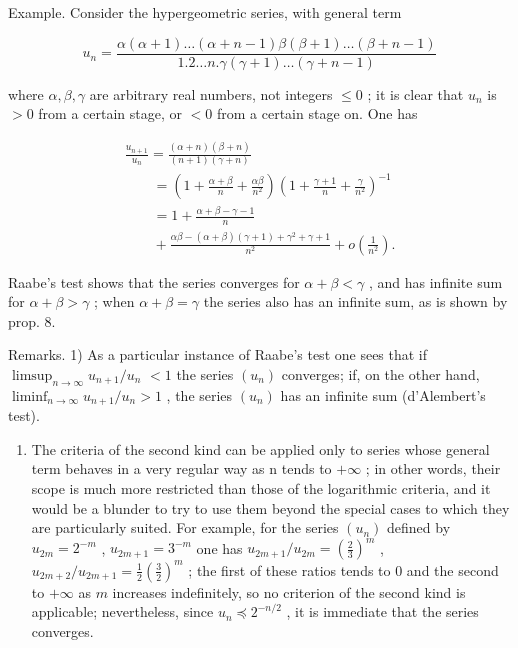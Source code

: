 Example. Consider the hypergeometric series, with general term

\[
u _ {n} = \frac {\alpha (\alpha + 1) \dots (\alpha + n - 1) \beta (\beta + 1) \dots (\beta + n - 1)}{1 . 2 \dots n . \gamma (\gamma + 1) \dots (\gamma + n - 1)}
\]

where \(\alpha, \beta, \gamma\) are arbitrary real numbers, not integers \(\leqslant 0\) ; it is clear that \(u_{n}\) is \(>0\) from a certain stage, or \(< 0\) from a certain stage on. One has

\[
\begin{array}{l} \frac {u _ {n + 1}}{u _ {n}} = \frac {(\alpha + n) (\beta + n)}{(n + 1) (\gamma + n)} \\ \qquad = \left(1 + \frac {\alpha + \beta}{n} + \frac {\alpha \beta}{n ^ {2}}\right) \left(1 + \frac {\gamma + 1}{n} + \frac {\gamma}{n ^ {2}}\right) ^ {- 1} \\ \qquad = 1 + \frac {\alpha + \beta - \gamma - 1}{n} \\ \qquad + \frac {\alpha \beta - (\alpha + \beta) (\gamma + 1) + \gamma^ {2} + \gamma + 1}{n ^ {2}} + o \left(\frac {1}{n ^ {2}}\right). \end{array}
\]

Raabe's test shows that the series converges for \(\alpha +\beta <  \gamma\) , and has infinite sum for \(\alpha +\beta >\gamma\) ; when \(\alpha +\beta = \gamma\) the series also has an infinite sum, as is shown by prop. 8.

Remarks. 1) As a particular instance of Raabe's test one sees that if \(\limsup_{n\to \infty}u_{n + 1} / u_n\) \(< 1\) the series \((u_{n})\) converges; if, on the other hand, \(\liminf_{n\to \infty}u_{n + 1} / u_n > 1\) , the series \((u_{n})\) has an infinite sum (d'Alembert's test).

\begin{enumerate}
\def\labelenumi{\arabic{enumi})}
\setcounter{enumi}{1}
\tightlist
\item
  The criteria of the second kind can be applied only to series whose general term behaves in a very regular way as n tends to \(+\infty\) ; in other words, their scope is much more restricted than those of the logarithmic criteria, and it would be a blunder to try to use them beyond the special cases to which they are particularly suited. For example, for the series \((u_{n})\) defined by \(u_{2m} = 2^{-m}\) , \(u_{2m + 1} = 3^{-m}\) one has \(u_{2m + 1} / u_{2m} = \left(\frac{2}{3}\right)^{m}\) , \(u_{2m + 2} / u_{2m + 1} = \frac{1}{2}\left(\frac{3}{2}\right)^{m}\) ; the first of these ratios tends to 0 and the second to \(+\infty\) as \(m\) increases indefinitely, so no criterion of the second kind is applicable; nevertheless, since \(u_{n} \preccurlyeq 2^{-n / 2}\) , it is immediate that the series converges.
\end{enumerate}

